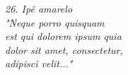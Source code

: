 \clearpage
\thispagestyle{empty}

\vspace*{\fill}

\begin{flushright}
    \itshape
    26. Ipê amarelo \\[0.5cm]

    "Neque porro quisquam \\
    est qui dolorem ipsum quia \\
    dolor sit amet, consectetur, \\
    adipisci velit..."
\end{flushright}

\clearpage
